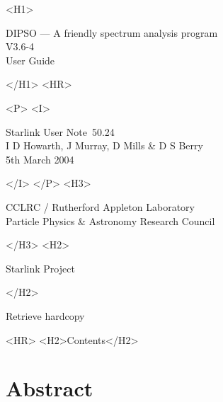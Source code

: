 \documentclass[twoside,11pt]{article}
\newcommand{\stardoccategory}  {Starlink User Note}
\newcommand{\stardocsource}    {sun\stardocnumber}
\newcommand{\stardocnumber} {50.24}
\newcommand{\stardocauthors} {I D Howarth, J Murray, D Mills \& D S Berry}
\newcommand{\stardocdate} {5th March 2004}
\newcommand{\stardoctitle} {DIPSO --- A friendly spectrum analysis program}
\newcommand{\stardocversion}   {V3.6-4}
\newcommand{\stardocmanual}    {User Guide}
\newcommand{\htmladdnormallink}[2]{#1}
\newcommand{\htmladdimg}[1]{}
\newcommand{\htmlref}[2]{#1}
\newcommand{\htmladdtonavigation}[1]{}
\newcommand{\xlabel}[1]{}
\renewcommand{\_}{\texttt{\symbol{95}}}
\begin{document}
\begin{htmlonly}
   \xlabel{}
   \begin{rawhtml} <H1> \end{rawhtml}
      \stardoctitle\\
      \stardocversion\\
      \stardocmanual
   \begin{rawhtml} </H1> <HR> \end{rawhtml}


   \begin{rawhtml} <P> <I> \end{rawhtml}
   \stardoccategory\ \stardocnumber \\
   \stardocauthors \\
   \stardocdate
   \begin{rawhtml} </I> </P> <H3> \end{rawhtml}
      \htmladdnormallink{CCLRC / Rutherford Appleton Laboratory}
                        {http://www.cclrc.ac.uk} \\
      \htmladdnormallink{Particle Physics \& Astronomy Research Council}
                        {http://www.pparc.ac.uk} \\
   \begin{rawhtml} </H3> <H2> \end{rawhtml}
      \htmladdnormallink{Starlink Project}{http://www.starlink.rl.ac.uk/}
   \begin{rawhtml} </H2> \end{rawhtml}
   \htmladdnormallink{\htmladdimg{source.gif} Retrieve hardcopy}
      {http://www.starlink.rl.ac.uk/cgi-bin/hcserver?\stardocsource}\\

  \label{stardoccontents}
  \begin{rawhtml} 
    <HR>
    <H2>Contents</H2>
  \end{rawhtml}
  \htmladdtonavigation{\htmlref{\htmladdimg{contents_motif.gif}}
        {stardoccontents}}

  \section{\xlabel{abstract}Abstract}
\end{htmlonly}
\end{document}
